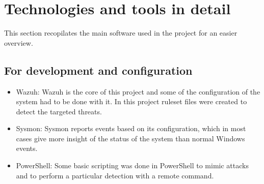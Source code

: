 \section{Technologies and tools in detail}
This section recopilates the main software used in the project for an easier overview.

\subsection{For development and configuration}
\begin{itemize}
	\item Wazuh: Wazuh\cite{wazuh} is the core of this project and some of the configuration of the system had to be done with it. In this project ruleset files were created to detect the targeted threats.
	\item Sysmon: Sysmon\cite{sysmon} reports events based on its configuration, which in most cases give more insight of the status of the system than normal Windows events.
	\item PowerShell: Some basic scripting\cite{memoria_github} was done in PowerShell to mimic attacks and to perform a particular detection with a remote command.
\end{itemize}

